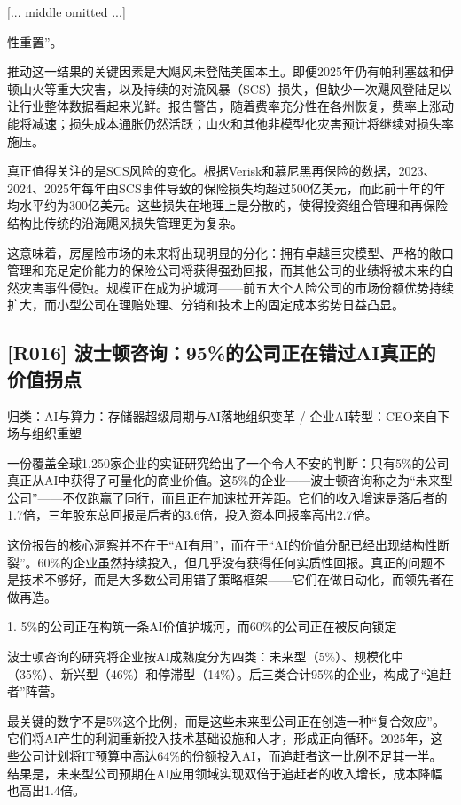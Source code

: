 \documentclass[11pt]{ctexart}
\begin{document}
[... middle omitted ...]

性重置”。

推动这一结果的关键因素是大飓风未登陆美国本土。即便2025年仍有帕利塞兹和伊顿山火等重大灾害，以及持续的对流风暴（SCS）损失，但缺少一次飓风登陆足以让行业整体数据看起来光鲜。报告警告，随着费率充分性在各州恢复，费率上涨动能将减速；损失成本通胀仍然活跃；山火和其他非模型化灾害预计将继续对损失率施压。

真正值得关注的是SCS风险的变化。根据Verisk和慕尼黑再保险的数据，2023、2024、2025年每年由SCS事件导致的保险损失均超过500亿美元，而此前十年的年均水平约为300亿美元。这些损失在地理上是分散的，使得投资组合管理和再保险结构比传统的沿海飓风损失管理更为复杂。

这意味着，房屋险市场的未来将出现明显的分化：拥有卓越巨灾模型、严格的敞口管理和充足定价能力的保险公司将获得强劲回报，而其他公司的业绩将被未来的自然灾害事件侵蚀。规模正在成为护城河——前五大个人险公司的市场份额优势持续扩大，而小型公司在理赔处理、分销和技术上的固定成本劣势日益凸显。

\subsection{[R016] 波士顿咨询：95\%的公司正在错过AI真正的价值拐点}
{\small\color{refgray}归类：AI与算力：存储器超级周期与AI落地组织变革 / 企业AI转型：CEO亲自下场与组织重塑}

一份覆盖全球1,250家企业的实证研究给出了一个令人不安的判断：只有5\%的公司真正从AI中获得了可量化的商业价值。这5\%的企业——波士顿咨询称之为“未来型公司”——不仅跑赢了同行，而且正在加速拉开差距。它们的收入增速是落后者的1.7倍，三年股东总回报是后者的3.6倍，投入资本回报率高出2.7倍。

这份报告的核心洞察并不在于“AI有用”，而在于“AI的价值分配已经出现结构性断裂”。60\%的企业虽然持续投入，但几乎没有获得任何实质性回报。真正的问题不是技术不够好，而是大多数公司用错了策略框架——它们在做自动化，而领先者在做再造。

1. 5\%的公司正在构筑一条AI价值护城河，而60\%的公司正在被反向锁定

波士顿咨询的研究将企业按AI成熟度分为四类：未来型（5\%）、规模化中（35\%）、新兴型（46\%）和停滞型（14\%）。后三类合计95\%的企业，构成了“追赶者”阵营。

最关键的数字不是5\%这个比例，而是这些未来型公司正在创造一种“复合效应”。它们将AI产生的利润重新投入技术基础设施和人才，形成正向循环。2025年，这些公司计划将IT预算中高达64\%的份额投入AI，而追赶者这一比例不足其一半。结果是，未来型公司预期在AI应用领域实现双倍于追赶者的收入增长，成本降幅也高出1.4倍。
\end{document}
